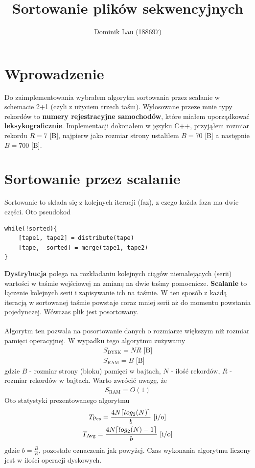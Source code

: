 \documentclass{article}
\title{Sortowanie plików sekwencyjnych}
\author{Dominik Lau (188697)}
\DeclarePairedDelimiter\ceil{\lceil}{\rceil}
\begin{document}
\maketitle

\section{Wprowadzenie}
Do zaimplementowania wybrałem algorytm sortowania przez scalanie w schemacie 2+1 (czyli z użyciem trzech taśm).  
Wylosowane przeze mnie typy rekordów to \textbf{numery rejestracyjne samochodów}, które miałem uporządkować \textbf{leksykograficznie}. Implementacji dokonałem w 
języku C++,  przyjąłem rozmiar rekordu $R=7$ [B], najpierw jako rozmiar strony ustaliłem  $B=70$ [B] a następnie
$B=700$ [B].
\section{Sortowanie przez scalanie}
Sortowanie to składa się z kolejnych iteracji (faz), z czego każda faza ma dwie części. Oto pseudokod
\begin{lstlisting}
while(!sorted){
	[tape1, tape2] = distribute(tape)
	[tape,  sorted] = merge(tape1, tape2)
}
\end{lstlisting}
\textbf{Dystrybucja} polega na rozkładaniu kolejnych ciągów niemalejących (serii) wartości w taśmie wejściowej 
na zmianę na dwie taśmy pomocnicze.  \textbf{Scalanie} to łączenie kolejnych serii i zapisywanie ich na taśmie. 
W ten sposób z każdą iteracją w sortowanej taśmie powstaje coraz mniej serii aż do momentu powstania pojedynczej. Wówczas plik jest posortowany. \\\\
Algorytm ten pozwala na posortowanie
danych o rozmiarze większym niż rozmiar pamięci operacyjnej. W wypadku tego algorytmu zużywamy 
\begin{gather*}
	S_{\text{DYSK}} = NR \text{  [B]}\\
	S_{\text{RAM}} = B \text{  [B]}
\end{gather*}
gdzie $B$ - rozmiar strony (bloku) pamięci w bajtach, $N$ - ilość rekordów, $R$ - rozmiar rekordów w bajtach. Warto zwrócić uwagę, że 
\begin{gather*}
	S_{\text{RAM}} = O(1)
\end{gather*}
Oto statystyki prezentowanego algorytmu
\begin{gather*}
	T_{\text{Pes}} = \frac{4N\ceil{log_2(N)}}{b} \text{  [i/o]}\\
	T_{\text{Avg}} = \frac{4N\ceil{log_2(N) - 1}}{b} \text{  [i/o]}
\end{gather*}
gdzie $b = \frac{B}{R}$, pozostałe oznaczenia jak powyżej.  Czas wykonania algorytmu liczony jest w ilości operacji
dyskowych.
\end{document}
